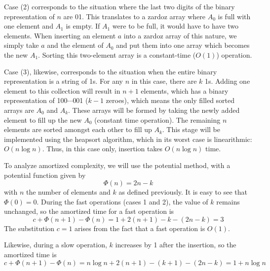 \documentclass[10pt]{article}
\begin{document}
Case (2) corresponds to the situation where the last two digits of the binary representation of $n$ are 01. This translates to a zardoz array where $A_0$ is full with one element and $A_1$ is empty. If $A_1$ were to be full, it would have to have two elements. When inserting an element $a$ into a zardoz array of this nature, we simply take $a$ and the element of $A_0$ and put them into one array which becomes the new $A_1$. Sorting this two-element array is a constant-time ($O(1)$) operation.

Case (3), likewise, corresponds to the situation when the entire binary representation is a string of 1s. For any $n$ in this case, there are $k$ 1s. Adding one element to this collection will result in $n+1$ elements, which has a binary representation of 100$\cdots$001 ($k-1$ zeroes), which means the only filled sorted arrays are $A_0$ and $A_k$. These arrays will be formed by taking the newly added element to fill up the new $A_0$ (constant time operation). The remaining $n$ elements are sorted amongst each other to fill up $A_k$. This stage will be implemented using the heapsort algorithm, which in its worst case is linearithmic: $O(n\log n)$. Thus, in this case only, insertion takes $O(n\log n)$ time.

To analyze amortized complexity, we will use the potential method, with a potential function given by $$\Phi(n) = 2n - k$$ with $n$ the number of elements and $k$ as defined previously. It is easy to see that $\Phi(0) = 0$. During the fast operations (cases 1 and 2), the value of $k$ remains unchanged, so the amortized time for a fast operation is $$c + \Phi(n + 1) - \Phi(n) = 1 + 2(n + 1) - k - (2n - k) = 3$$ The substitution $c = 1$ arises from the fact that a fast operation is $O(1)$.

Likewise, during a slow operation, $k$ increases by 1 after the insertion, so the amortized time is $$c + \Phi(n + 1) - \Phi(n) = n\log n + 2(n + 1) - (k + 1) - (2n - k) = 1 + n\log n$$
\end{document}
